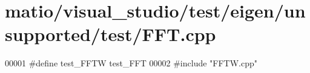 \hypertarget{matio_2visual__studio_2test_2eigen_2unsupported_2test_2_f_f_t_8cpp_source}{}\section{matio/visual\+\_\+studio/test/eigen/unsupported/test/\+F\+FT.cpp}
\label{matio_2visual__studio_2test_2eigen_2unsupported_2test_2_f_f_t_8cpp_source}

\begin{DoxyCode}
00001 \textcolor{preprocessor}{#define test\_FFTW test\_FFT}
00002 \textcolor{preprocessor}{#include "FFTW.cpp"}
\end{DoxyCode}
